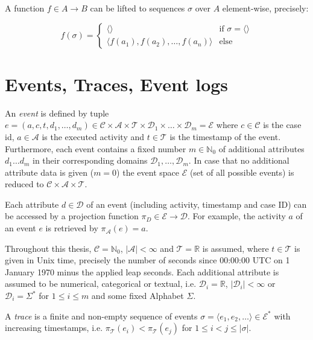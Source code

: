 A function $f \in A \rightarrow B$ can be lifted to sequences $\sigma$ over $A$ element-wise, precisely:

	\[
	f(\sigma) =
	\begin{cases}
	\langle \rangle & \text{if $\sigma = \langle \rangle$} \\
	\langle f(a_1), f(a_2), \dots, f(a_n)\rangle & \text{else} 
	\end{cases}
	\]


\section{Events, Traces, Event logs}

\begin{definition}
An  \textit{event} is defined by tuple $e = (a,c,t,d_1,\dots, d_m) \in \mathcal{C} \times \mathcal{A}  \times \mathcal{T} \times \mathcal{D}_1 \times \dots \times \mathcal{D}_m =  \mathcal{E}$ where  $c \in \mathcal{C} $ is the case id, $a \in \mathcal{A}$ is the executed activity and $t \in \mathcal{T}$ is the timestamp of the event.
Furthermore, each event contains a fixed number $m \in \mathbb{N}_0$ of additional attributes $d_1 \dots d_m$ in their corresponding domains $\mathcal{D}_1, \dots , \mathcal{D}_m$.
In case that no additional attribute data is given ($m = 0$) the event space $\mathcal{E}$ (set of all possible events) is reduced to $\mathcal{C} \times \mathcal{A}  \times \mathcal{T}$.
\end{definition}

Each attribute $d \in \mathcal{D}$ of an event (including activity, timestamp and case ID) can be accessed by a projection function $\pi_D \in \mathcal{E} \rightarrow \mathcal{D}$.
For example, the activity $a$ of an event $e$ is retrieved by $\pi_\mathcal{A}(e) = a$.

Throughout this thesis,  $\mathcal{C} = \mathbb{N}_0$, $|\mathcal{A}| < \infty$ and $ \mathcal{T} = \mathbb{R}$ is assumed, where $t \in \mathcal{T}$ is given in Unix time, precisely the number of seconds since 00:00:00 UTC on 1 January 1970 minus the applied leap seconds.
Each additional attribute is assumed to be numerical, categorical or textual, i.e. $\mathcal{D}_i = \mathbb{R}$, $|\mathcal{D}_i| < \infty$ or $\mathcal{D}_i = \Sigma^\ast$  for $1 \leq i \leq m$ and some fixed Alphabet $\Sigma$.

\begin{definition}
	A \textit{trace} is a finite and non-empty sequence of events $\sigma = \langle e_1, e_2, \dots\rangle \in  \mathcal{E}^\ast$ with increasing timestamps, i.e. $\pi_\mathcal{T} (e_i) < \pi_\mathcal{T} (e_j) $ for $1 \leq i < j \leq |\sigma|$.
\end{definition}


